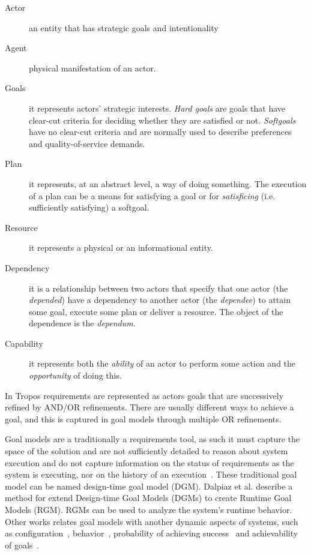 \begin{description}%
  \item[Actor] an entity that has strategic goals and intentionality

  \item[Agent] physical manifestation of an actor.

  \item[Goals] it represents actors’ strategic interests. \emph{Hard goals} are goals that have clear-cut criteria for deciding whether they are satisfied or not. \emph{Softgoals} have no clear-cut criteria and are normally used to describe preferences and quality-of-service demands.

  \item[Plan] it represents, at an abstract level, a way of doing something. The execution of a plan can be a means for satisfying a goal or for \emph{satisficing} (i.e. sufficiently satisfying) a softgoal.

  \item[Resource]  it represents a physical or an informational entity.

  \item[Dependency] it is a relationship between two actors that specify that one actor (the \emph{depended}) have a dependency to another actor (the \emph{dependee}) to attain some goal, execute some plan or deliver a resource. The object of the dependence is the \emph{dependum}.

  \item[Capability] it represents both the \emph{ability} of an actor to perform some action and the \emph{opportunity} of doing this.

\end{description}


In Tropos requirements are represented as actors goals that are successively refined by AND/OR refinements. There are usually different ways to achieve a goal, and this is captured in goal models through multiple OR refinements.

Goal models are a traditionally a requirements tool, as such it must capture the space of the solution and are not sufficiently detailed to reason about system execution and do not capture information on the status of requirements as the system is executing, nor on the history of an execution~\cite{borgida_requirements_2013}. These traditional goal model can be named design-time goal model (DGM). Dalpiaz et al.\cite{dalpiaz_runtime_2013} describe a method for extend Design-time Goal Models (DGMs) to create Runtime Goal Models (RGM). RGMs can be used to analyze the system's runtime behavior. Other works relates goal models with another dynamic aspects of systems, such as configuration~\cite{yu_goals_2008}, behavior~\cite{dalpiaz_runtime_2013},  probability of achieving success~\cite{mendonca_dependability_2015} and achievability of goals~\cite{pontes_guimaraes_pragmatic_2015}.

